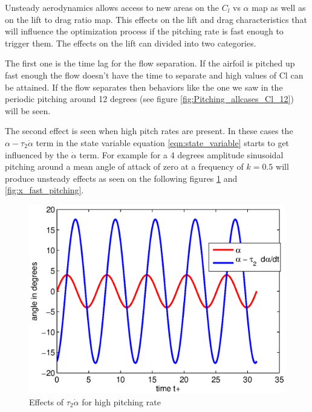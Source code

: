Unsteady aerodynamics allows access to new areas on the $C_l$ vs $\alpha$ map as well as on the lift to drag ratio map.
This effects on the lift and drag characteristics that will influence the optimization process if the pitching rate is fast enough to trigger them.
The effects on the lift can divided into two categories.

\par The first one is the time lag for the flow separation. 
If the airfoil is pitched up fast enough the flow doesn't have the time to separate and high values of Cl can be attained.
If the flow separates then behaviors like the one we saw in the periodic pitching around 12 degrees (see figure \ref{fig:Pitching_allcases_Cl_12}) will be seen.

\par The second effect is seen when high pitch rates are present.
In these cases the $\alpha - \tau_2 \dot{\alpha}$ term in the state variable equation \ref{eqn:state_variable} starts to get influenced by the $\dot{\alpha}$ term. 
For example for a 4 degrees amplitude sinusoidal pitching around a mean angle of attack of zero at a frequency of $k=0.5$ will produce unsteady effects as seen on the following figures \ref{fig:alpha_dalpha_vs_t} and \ref{fig:x_fast_pitching}.

\begin{figure}[h]
  \centering
  \includegraphics{./Figures/alpha_dalpha_sin_amp=4_k=0p5.eps}
  \caption{Effects of $\tau_2 \dot{\alpha}$ for high pitching rate}
  \label{fig:alpha_dalpha_vs_t}
\end{figure}


